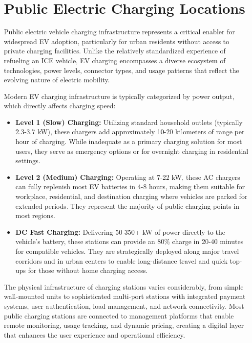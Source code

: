 \section{Public Electric Charging Locations}

Public electric vehicle charging infrastructure represents a critical enabler for widespread EV adoption, particularly for urban residents without access to private charging facilities. Unlike the relatively standardized experience of refueling an ICE vehicle, EV charging encompasses a diverse ecosystem of technologies, power levels, connector types, and usage patterns that reflect the evolving nature of electric mobility.

Modern EV charging infrastructure is typically categorized by power output, which directly affects charging speed:

\begin{itemize}
    \item \textbf{Level 1 (Slow) Charging:} Utilizing standard household outlets (typically 2.3-3.7 kW), these chargers add approximately 10-20 kilometers of range per hour of charging. While inadequate as a primary charging solution for most users, they serve as emergency options or for overnight charging in residential settings.

    \item \textbf{Level 2 (Medium) Charging:} Operating at 7-22 kW, these AC chargers can fully replenish most EV batteries in 4-8 hours, making them suitable for workplace, residential, and destination charging where vehicles are parked for extended periods. They represent the majority of public charging points in most regions.

    \item \textbf{DC Fast Charging:} Delivering 50-350+ kW of power directly to the vehicle's battery, these stations can provide an 80\% charge in 20-40 minutes for compatible vehicles. They are strategically deployed along major travel corridors and in urban centers to enable long-distance travel and quick top-ups for those without home charging access.
\end{itemize}

The physical infrastructure of charging stations varies considerably, from simple wall-mounted units to sophisticated multi-port stations with integrated payment systems, user authentication, load management, and network connectivity. Most public charging stations are connected to management platforms that enable remote monitoring, usage tracking, and dynamic pricing, creating a digital layer that enhances the user experience and operational efficiency.

